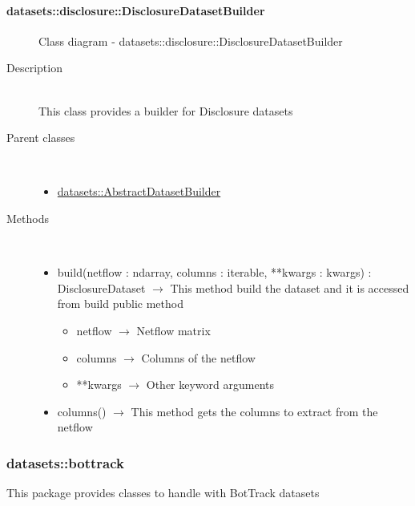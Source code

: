 \paragraph[DisclosureDatasetBuilder]{datasets::disclosure::DisclosureDatasetBuilder}
 \hfill\begin{figure}[h]
\centering
{}
\caption{Class diagram - datasets::disclosure::DisclosureDatasetBuilder}
\end{figure}\begin{description}
\item[Description] \hfill \\
 This class provides a builder for Disclosure datasets
\item[Parent classes] \hfill \\
 \vspace{-1cm}
\begin{itemize}
\item \hyperlink{datasets::AbstractDatasetBuilder}{datasets::AbstractDatasetBuilder}
\end{itemize}

\item[Methods] \hfill \\
 \vspace{-1cm}
\begin{itemize}
\item build(netflow : ndarray, columns : iterable, **kwargs : kwargs) : DisclosureDataset $\rightarrow$ This method build the dataset and it is accessed from build public method\begin{itemize}
\item netflow $\rightarrow$ Netflow matrix
\item columns $\rightarrow$ Columns of the netflow
\item **kwargs $\rightarrow$ Other keyword arguments
\end{itemize}

\item columns() $\rightarrow$ This method gets the columns to extract from the netflow
\end{itemize}

\end{description}
\subsubsection{datasets::bottrack}
This package provides classes to handle with BotTrack datasets

